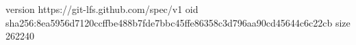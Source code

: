 version https://git-lfs.github.com/spec/v1
oid sha256:8ea5956d7120ccffbe488b7fde7bbc45ffe86358c3d796aa90cd45644c6c22cb
size 262240

